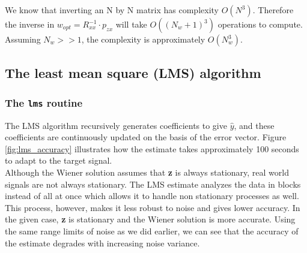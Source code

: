 \documentclass{article}
\begin{document}
We know that inverting an N by N matrix has complexity $O(N^3)$. Therefore the inverse in $w_{opt}=R_{xx}^{-1} \cdot p_{zx}$ will take $O((N_w+1)^3)$ operations to compute. Assuming $N_w>>1$, the complexity is approximately $O(N_w^3)$.

\pagebreak

\subsection{The least mean square (LMS) algorithm}

\subsubsection{The \texttt{lms} routine}

The LMS algorithm recursively generates coefficients to give $\hat{y}$, and these coefficients are continuously updated on the basis of the error vector. Figure \ref{fig:lms_accuracy} illustrates how the estimate takes approximately 100 seconds to adapt to the target signal.\\

Although the Wiener solution assumes that \textbf{z} is always stationary, real world signals are not always stationary. The LMS estimate analyzes the data in blocks instead of all at once which allows it to handle non stationary processes as well. This process, however, makes it less robust to noise and gives lower accuracy. In the given case, \textbf{z} is stationary and the Wiener solution is more accurate. Using the same range limits of noise as we did earlier, we can see that the accuracy of the estimate degrades with increasing noise variance. 
\end{document}
